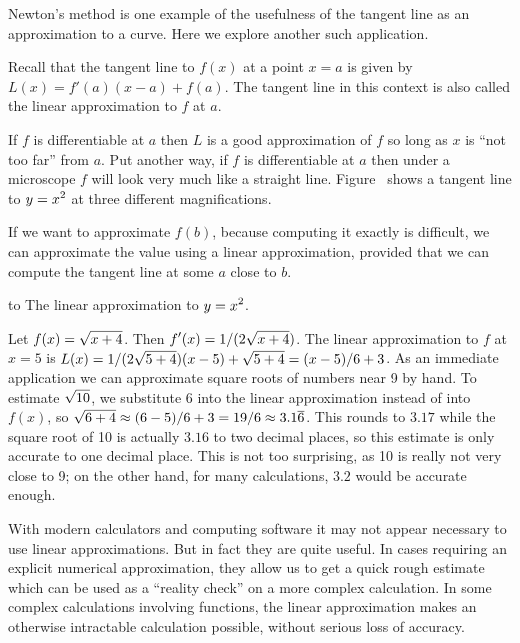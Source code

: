 \nobreak
Newton's method is one example of the usefulness of the tangent line
as an approximation to a curve. Here we explore another such
application.

Recall that the tangent line to $f(x)$ at a point $x=a$ is given by
$L(x) = f'(a) (x-a) + f(a)$.  The tangent line in this context is also
called the {\dfont linear approximation\/}
to $f$ at $a$.

If $f$ is differentiable at $a$ then $L$ is a good approximation of
$f$ so long as $x$ is ``not too far'' from $a$.  Put another way, if
$f$ is differentiable at $a$ then under a microscope $f$ will look
very much like a straight line. Figure~ shows a tangent line to $\displaystyle y=x^2$ at three different
magnifications. 

If we want to approximate $f(b)$,
because computing it exactly is difficult, we can approximate the
value using a linear approximation, provided that we can compute the
tangent line at some $a$ close to $b$.

\figure
\texonly
\hbox to 
\endtexonly
{}
\begincaption
The linear approximation to $\displaystyle y=x^2$.
\endcaption
\endfigure

\example Let $\displaystyle f(x)=\sqrt{x+4}$. Then $\displaystyle f'(x)=1/(2\sqrt{x+4})$.
 The linear approximation to $f$ at $x=5$ is $\displaystyle
L(x)=1/(2\sqrt{5+4})(x-5)+\sqrt{5+4}=(x-5)/6+3$.  As an immediate
application we can approximate square roots of numbers near 9 by hand.
To estimate $\displaystyle\sqrt{10}$, we substitute 6 into the linear
approximation instead of into $f(x)$, so
$\displaystyle \sqrt{6+4}\approx (6-5)/6+3 = 19/6\approx 3.1\overline{6}$.
This rounds to $3.17$ while the square root of 10 is actually
$3.16$ to two decimal places, so this estimate is only accurate to one
decimal place. This is not too surprising, as 10 is really not very
close to 9; on the other hand, for many calculations, $3.2$ would be
accurate enough.
\endexample

With modern calculators and computing software it may not appear
necessary to use linear approximations. But in fact they are quite
useful. In cases requiring an explicit numerical approximation, they
allow us to get a quick rough estimate which can be used as a
``reality check'' on a more complex calculation. In some complex
calculations involving functions, the linear approximation makes an
otherwise intractable calculation possible, without serious loss of
accuracy.

